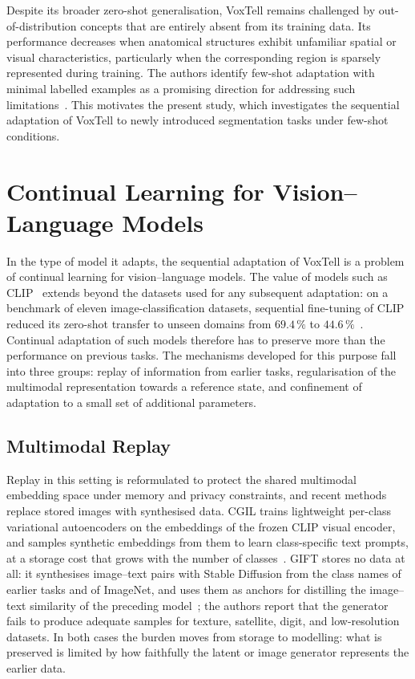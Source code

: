 Despite its broader zero-shot generalisation, VoxTell remains challenged by out-of-distribution concepts that are entirely absent from its training data. Its performance decreases when anatomical structures exhibit unfamiliar spatial or visual characteristics, particularly when the corresponding region is sparsely represented during training. The authors identify few-shot adaptation with minimal labelled examples as a promising direction for addressing such limitations~\cite{rokuss2025voxtellfreetextpromptableuniversal}. This motivates the present study, which investigates the sequential adaptation of VoxTell to newly introduced segmentation tasks under few-shot conditions.

\section{Continual Learning for Vision--Language Models}
\label{sec:cl-vlm}

In the type of model it adapts, the sequential adaptation of VoxTell is a problem of continual learning for vision--language models. The value of models such as CLIP~\cite{radford2021learningtransferablevisualmodels} extends beyond the datasets used for any subsequent adaptation: on a benchmark of eleven image-classification datasets, sequential fine-tuning of CLIP reduced its zero-shot transfer to unseen domains from $69.4\,\%$ to $44.6\,\%$~\cite{zheng2023preventingzeroshottransferdegradation}. Continual adaptation of such models therefore has to preserve more than the performance on previous tasks. The mechanisms developed for this purpose fall into three groups: replay of information from earlier tasks, regularisation of the multimodal representation towards a reference state, and confinement of adaptation to a small set of additional parameters.

\subsection{Multimodal Replay}

Replay in this setting is reformulated to protect the shared multimodal embedding space under memory and privacy constraints, and recent methods replace stored images with synthesised data. CGIL trains lightweight per-class variational autoencoders on the embeddings of the frozen CLIP visual encoder, and samples synthetic embeddings from them to learn class-specific text prompts, at a storage cost that grows with the number of classes~\cite{frascaroli2024clipgenerativelatentreplay}. GIFT stores no data at all: it synthesises image--text pairs with Stable Diffusion from the class names of earlier tasks and of ImageNet, and uses them as anchors for distilling the image--text similarity of the preceding model~\cite{wu2024gift}; the authors report that the generator fails to produce adequate samples for texture, satellite, digit, and low-resolution datasets. In both cases the burden moves from storage to modelling: what is preserved is limited by how faithfully the latent or image generator represents the earlier data.

